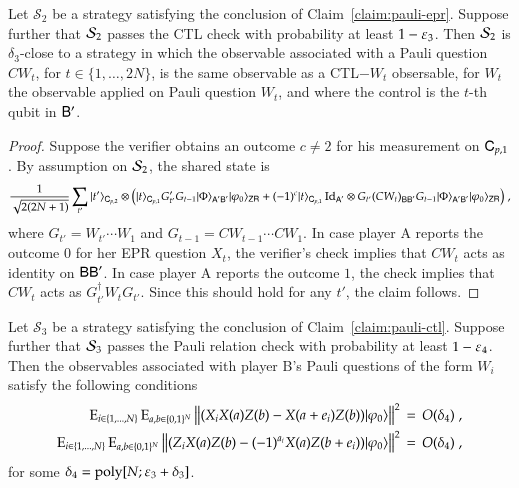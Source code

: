\begin{claim}\label{claim:pauli-ctl}
Let $\mathcal{S}_2$ be a strategy satisfying the conclusion of Claim~\ref{claim:pauli-epr}. Suppose further that $\mathcal{S}_2$ passes the CTL check with probability at least $1-\varepsilon_3$. Then $\mathcal{S}_2$ is $\delta_3$-close to a strategy in which the observable associated with a Pauli question $CW_t$, for $t\in\{1,\ldots,2N\}$, is the same observable as a CTL$-W_t$ obsersable, for $W_t$ the observable applied on Pauli question $W_t$, and where the control is the $t$-th qubit in ${\mathsf{B}}'$. 
\end{claim}

\begin{proof}
Suppose the verifier obtains an outcome $c\neq 2$ for his measurement on ${\textsf{C}}_{p,1}$. By assumption on $\mathcal{S}_2$, the shared state is 
\[ \frac{1}{\sqrt{2(2N+1)}}\sum_{t'} |t'\rangle_{{\textsf{C}}_{p,2}}\otimes \big(|t\rangle_{{\textsf{C}}_{p,1}} G'_{t'} G_{t-1} |\Phi\rangle_{{\textsf{A}}'{\textsf{B}}'}  |\varphi_0\rangle_{{\textsf{ZR}}} + (-1)^c  |t\rangle_{{\textsf{C}}_{p,1}} \mathop{\mathrm{Id}}\!\mathinner{}_{{\textsf{A}}'} \otimes G_{t'} (CW_t)_{{\textsf{B}}{\textsf{B}}'} G_{t-1}|\Phi\rangle_{{\textsf{A}}'{\textsf{B}}'} |\varphi_0\rangle_{{\textsf{ZR}}}\big)\;,\]
where $G_{t'} = W_{t'}\cdots W_1$ and $G_{t-1} =  CW_{t-1}\cdots CW_1$. 
In case player A reports the outcome $0$ for her EPR question $X_t$, the verifier's check implies that $CW_t$ acts as identity on ${\textsf{B}}{\textsf{B}}'$. In case player A reports the outcome $1$, the check implies that $CW_t$ acts as $G_{t'}^\dagger W_t G_{t'}$. Since this should hold for any $t'$, the claim follows. 
\end{proof}

\begin{claim}\label{claim:pauli-relation}
Let $\mathcal{S}_3$ be a strategy satisfying the conclusion of Claim~\ref{claim:pauli-ctl}. Suppose further that $\mathcal{S}_3$ passes the Pauli relation check with probability at least $1-\varepsilon_4$. Then the observables associated with player B's Pauli questions of the form $W_i$ satisfy the following conditions 
\begin{align}
\Es{i\in\{1,\ldots,N\}} \,\Es{a,b\in\{0,1\}^N}\,\big\| (X_i X(a) Z(b) -  X(a+e_i)Z(b) ) \ket{\varphi_0}\big\|^2\,=\,O(\delta_4)\;,\label{eq:x-com}\\
\Es{i\in\{1,\ldots,N\}} \,\Es{a,b\in\{0,1\}^N}\,\big\| (Z_i X(a) Z(b)- (-1)^{a_i} X(a)Z(b+e_i) ) \ket{\varphi_0}\big\|^2\,=\,O(\delta_4) \;,\label{eq:z-com}
\end{align}
for some $\delta_4 = \operatorname{poly}[N;\varepsilon_3+\delta_3]$.
\end{claim}

